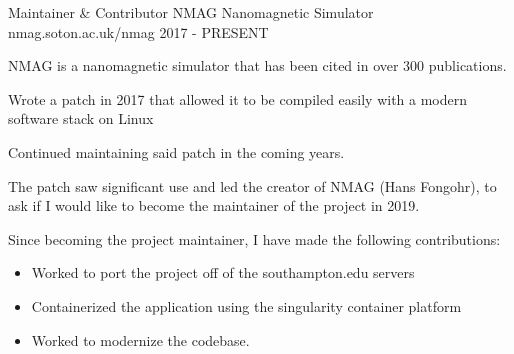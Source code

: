 


\begin{cventries}


\cventry
{Maintainer \& Contributor} %
{NMAG Nanomagnetic Simulator} %
{nmag.soton.ac.uk/nmag} %
{2017 - PRESENT} %
{ %
\begin{cvitems}
\item {NMAG is a nanomagnetic simulator that has been cited in over 300 publications.}
\item {Wrote a patch in 2017 that allowed it to be compiled easily with a modern software stack on Linux}
\item {Continued maintaining said patch in the coming years.}
\item {The patch saw significant use and led the creator of NMAG (Hans Fongohr), to ask if I would like to become the maintainer of the project in 2019.}
\item {Since becoming the project maintainer, I have made the following contributions:}
\begin {itemize}
\item {Worked to port the project off of the southampton.edu servers}
\item {Containerized the application using the singularity container platform}
\item {Worked to modernize the codebase.}
\end{itemize}
\end{cvitems}
}


\end{cventries}

